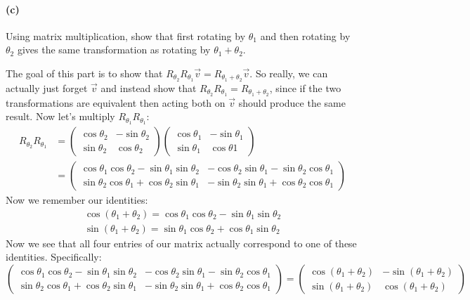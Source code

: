 \documentclass{article}
\begin{document}
\paragraph{(c)}
Using matrix multiplication, show that first rotating by $\theta_{1}$ and then rotating by $\theta_{2}$ gives the same transformation as rotating by $\theta_{1}+\theta_{2}$.

\begin{solution}
	The goal of this part is to show that $R_{\theta_2} R_{\theta_1} \vec v = R_{\theta_1 + \theta_2} \vec v$. 
	So really, we can actually just forget $\vec v$ and instead show that $R_{\theta_2}R_{\theta_1} = R_{\theta_1
	+ \theta_2}$, since if the two transformations are equivalent then acting both on $\vec v$ should produce
	the same result. Now let's multiply $R_{\theta_1} R_{\theta_1}$:
	\begin{align*}
		R_{\theta_2}R_{\theta_1} &= \begin{pmatrix} \cos \theta_2 & - \sin \theta_2\\ \sin \theta_2 & \cos \theta_2 \end{pmatrix} \begin{pmatrix} \cos \theta_1 & - \sin \theta_1\\ \sin \theta_1 & \cos \theta 1 \end{pmatrix} \\
								 &= \begin{pmatrix} \cos \theta_1 \cos \theta_2 - \sin \theta_1 \sin \theta_2 & -\cos \theta_2 \sin \theta_1 - \sin \theta_2 \cos \theta_1\\ \sin \theta_2 \cos \theta_1 + \cos \theta_2 \sin \theta_1 & -\sin \theta_2 \sin \theta_1 + \cos \theta_2 \cos \theta_1 \end{pmatrix} 
	\end{align*}
	Now we remember our identities: 
	\begin{align*}
		\cos (\theta_1 + \theta_2) = \cos \theta_1 \cos \theta_2 - \sin \theta_1 \sin \theta_2\\
		\sin(\theta_1 + \theta_2) = \sin \theta_1 \cos \theta_2 + \cos\theta_1 \sin \theta_2
	\end{align*}
	Now we see that all four entries of our matrix actually correspond to one of these identities. Specifically: 
	\[
		\begin{pmatrix} \cos \theta_1 \cos \theta_2 - \sin \theta_1 \sin \theta_2 & -\cos \theta_2 \sin \theta_1 - \sin \theta_2 \cos \theta_1\\ \sin \theta_2 \cos \theta_1 + \cos \theta_2 \sin \theta_1 & -\sin \theta_2 \sin \theta_1 + \cos \theta_2 \cos \theta_1 \end{pmatrix} = \begin{pmatrix} \cos(\theta_1 + \theta_2) & -\sin (\theta_1 + \theta_2) \\ \sin(\theta_1 + \theta_2) & \cos(\theta_1 + \theta_2) \end{pmatrix} 
\]
\end{solution}
\end{document}
